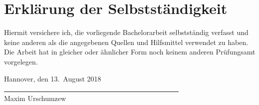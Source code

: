 \chapter*{Erklärung der Selbstständigkeit}

\thispagestyle{empty}

Hiermit versichere ich, die vorliegende Bachelorarbeit selbstständig
verfasst und keine anderen als die angegebenen Quellen und Hilfsmittel
verwendet zu haben. Die Arbeit hat in gleicher oder ähnlicher Form noch
keinem anderen Prüfungsamt vorgelegen.

\vspace*{2em}
\begin{flushleft}
  \expandafter{Hannover}, den \expandafter{13.\ August 2018}\\
  \vspace*{2em}
  \underline{~~~~~~~~~~~~~~~~~~~~~~~~~~~~~~~~~~~~~~~~~~~~~~~~~~}\\
  \expandafter{Maxim Urschumzew}
\end{flushleft}

